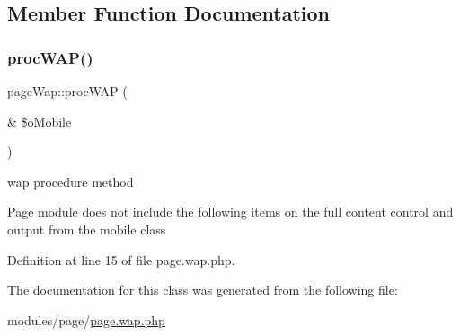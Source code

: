 \subsection{Member Function Documentation}
\hypertarget{classpageWap_a7ee56942979074bd2b79621dfc7349e9}{}\label{classpageWap_a7ee56942979074bd2b79621dfc7349e9} 
\subsubsection{\texorpdfstring{proc\+W\+A\+P()}{procWAP()}}
{\footnotesize\ttfamily page\+Wap\+::proc\+W\+AP (\begin{DoxyParamCaption}\item[{\&}]{\$o\+Mobile }\end{DoxyParamCaption})}



wap procedure method 

Page module does not include the following items on the full content control and output from the mobile class 

Definition at line 15 of file page.\+wap.\+php.



The documentation for this class was generated from the following file\+:\begin{DoxyCompactItemize}
\item 
modules/page/\hyperlink{page_8wap_8php}{page.\+wap.\+php}\end{DoxyCompactItemize}
